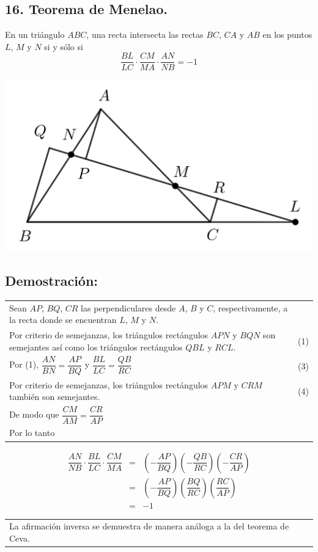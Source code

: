 \documentclass[12pt,a4paper]{article}
\begin{document}
\subsection*{16. Teorema de Menelao.}
En un triángulo $ABC$, una recta intersecta las rectas $BC$, $CA$ y $AB$ en los puntos $L$, $M$ y $N$ si y sólo si
$$\dfrac{BL}{LC}\cdot\dfrac{CM}{MA}\cdot\dfrac{AN}{NB}=-1$$
\begin{center}
\includegraphics[scale=0.7]{Menelao1.png} 
\end{center}
\subsection*{Demostración:}
\begin{tabular}{p{15.9 cm} p{1cm}}
Sean $AP$, $BQ$, $CR$ las perpendiculares desde $A$, $B$ y $C$, respectivamente, a la recta donde se encuentran $L$, $M$ y $N$.
\\Por criterio de semejanzas, los triángulos rectángulos $APN$ y $BQN$ son semejantes así como los triángulos rectángulos $QBL$ y $RCL$. &(1)
\\Por (1), $\dfrac{AN}{BN}=\dfrac{AP}{BQ}$ y $\dfrac{BL}{LC}=\dfrac{QB}{RC}$ &(3)
\\Por criterio de semejanzas, los triángulos rectángulos $APM$ y $CRM$ también son semejantes.&(4)
\\ De modo que $\dfrac{CM}{AM}=\dfrac{CR}{AP}$
\\Por lo tanto
\end{tabular}
\begin{eqnarray*}
\dfrac{AN}{NB}\cdot \dfrac{BL}{LC}\cdot \dfrac{CM}{MA} &=& \left( - \dfrac{AP}{BQ}\right)  \left( -  \dfrac{QB}{RC} \right) \left( - \dfrac{CR}{AP}\right)
\\&=& \left(- \dfrac{AP}{BQ}\right) \left( \dfrac{BQ}{RC}\right) \left(\dfrac{RC}{AP} \right)
\\&=& -1
\end{eqnarray*}
\begin{tabular}{p{15.9 cm} p{1cm}}
La afirmación inversa se demuestra de manera análoga a la del teorema de Ceva.
\end{tabular}
\end{document}
